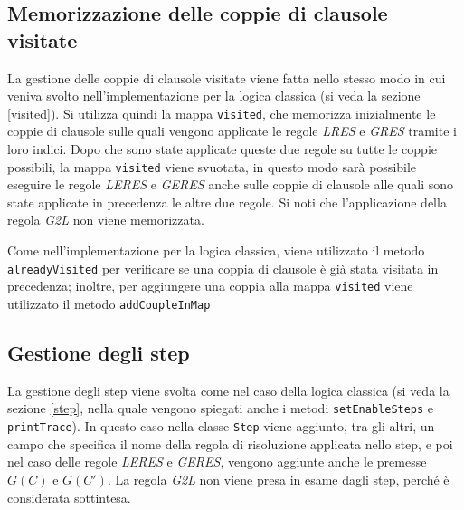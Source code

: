 \documentclass[a4paper,12pt]{report}
\begin{document}
\subsection{Memorizzazione delle coppie di clausole visitate}
La gestione delle coppie di clausole visitate viene fatta nello stesso modo in cui veniva svolto nell'implementazione per la logica classica (si veda la sezione \ref{visited}). Si utilizza quindi la mappa \texttt{visited}, che memorizza inizialmente le coppie di clausole sulle quali vengono applicate le regole \emph{LRES} e \emph{GRES} tramite i loro indici. Dopo che sono state applicate queste due regole su tutte le coppie possibili, la mappa \texttt{visited} viene svuotata, in questo modo sarà possibile eseguire le regole \emph{LERES} e \emph{GERES} anche sulle coppie di clausole alle quali sono state applicate in precedenza le altre due regole. Si noti che l'applicazione della regola \emph{G2L} non viene memorizzata.

Come nell'implementazione per la logica classica, viene utilizzato il metodo \\ \texttt{alreadyVisited} per verificare se una coppia di clausole è già stata visitata in precedenza; inoltre, per aggiungere una coppia alla mappa \texttt{visited} viene utilizzato il metodo \texttt{addCoupleInMap}

\subsection{Gestione degli step}
La gestione degli step viene svolta come nel caso della logica classica (si veda la sezione \ref{step}, nella quale vengono spiegati anche i metodi \texttt{setEnableSteps} e \texttt{printTrace}). In questo caso nella classe \texttt{Step} viene aggiunto, tra gli altri, un campo che specifica il nome della regola di risoluzione applicata nello step, e poi nel caso delle regole \emph{LERES} e \emph{GERES}, vengono aggiunte anche le premesse $G(C)$ e $G(C')$. La regola \emph{G2L} non viene presa in esame dagli step, perché è considerata sottintesa.
\end{document}
